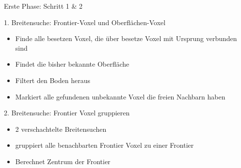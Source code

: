 \documentclass{beamer}
\begin{document}
\begin{frame}{Erste Phase: Schritt 1 \& 2}

	\begin{block}{1. Breitensuche: Frontier-Voxel und Oberflächen-Voxel}
		\begin{itemize}
			\item Finde alle besetzen Voxel, die über besetze Voxel mit Ursprung verbunden sind
			\item Findet die bisher bekannte Oberfläche
			\item Filtert den Boden heraus
			\item Markiert alle gefundenen unbekannte Voxel die freien Nachbarn haben
		\end{itemize}
	\end{block}
	\begin{exampleblock}{2. Breitensuche: Frontier Voxel gruppieren}
		\begin{itemize}
			\item 2 verschachtelte Breitensuchen
			\item gruppiert alle benachbarten Frontier Voxel zu einer Frontier
			\item Berechnet Zentrum der Frontier
		\end{itemize}
	\end{exampleblock}
\end{frame}
\end{document}
